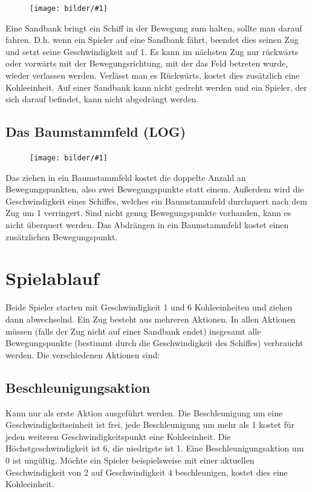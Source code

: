 \documentclass[12pt,a4paper, ngerman, oneside]{scrartcl}
\newcommand{\fieldGraphic}[1]{%
\begin{figure}%
  \texttt{[image: bilder/\#1]}%
\end{figure}%
}
\begin{document}
\fieldGraphic{sandbank}

Eine Sandbank bringt ein Schiff in der Bewegung zum halten, sollte man darauf
fahren. D.h. wenn ein Spieler auf eine Sandbank fährt, beendet dies seinen Zug
und setzt seine Geschwindigkeit auf 1. Es kann im nächsten Zug nur rückwärts
oder vorwärts mit der Bewegungsrichtung, mit der das Feld betreten wurde, wieder
verlassen werden. Verlässt man es Rückwärts, kostet dies zusätzlich eine
Kohleeinheit. Auf einer Sandbank kann nicht gedreht werden und ein Spieler, der
sich darauf befindet, kann nicht abgedrängt werden.


\subsection{Das Baumstammfeld (LOG)}

\fieldGraphic{baumstaemme}

Das ziehen in ein Baumstammfeld kostet die doppelte Anzahl an Bewegungspunkten,
also zwei Bewegungspunkte statt einem. Außerdem wird die Geschwindigkeit eines
Schiffes, welches ein Baumstammfeld durchquert nach dem Zug um 1 verringert.
Sind nicht genug Bewegungspunkte vorhanden, kann es nicht überquert werden. Das
Abdrängen in ein Baumstammfeld kostet einen zusätzlichen Bewegungspunkt.


\section{Spielablauf}

Beide Spieler starten mit Geschwindigkeit 1 und 6 Kohleeinheiten und ziehen dann
abwechselnd. Ein Zug besteht aus mehreren Aktionen. In allen Aktionen müssen
(falls der Zug nicht auf einer Sandbank endet) insgesamt alle Bewegungspunkte
(bestimmt durch die Geschwindigkeit des Schiffes) verbraucht werden. Die
verschiedenen Aktionen sind:


\subsection{\label{acceleration}Beschleunigungsaktion}

Kann nur als erste Aktion ausgeführt werden. Die Beschleunigung um eine
Geschwindigkeitseinheit ist frei, jede Beschleunigung um mehr als 1 kostet für
jeden weiteren Geschwindigkeitspunkt eine Kohleeinheit. Die
Höchstgeschwindigkeit ist 6, die niedrigste ist 1. Eine Beschleunigungsaktion um
0 ist ungültig. Möchte ein Spieler beispielsweise mit einer aktuellen
Geschwindigkeit von 2 auf Geschwindigkeit 4 beschleunigen, kostet dies eine
Kohleeinheit.
\end{document}
